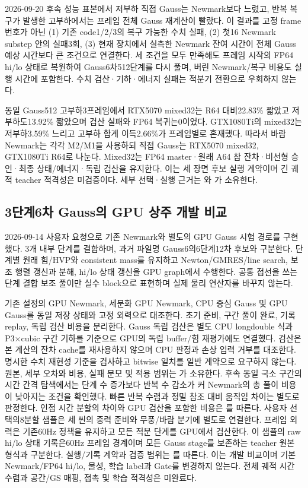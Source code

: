 \documentclass[10pt]{article}
\begin{document}
2026-09-20 후속 성능 표본에서 저부하 직접 Gauss는 Newmark보다 느렸고,
반복 복구가 발생한 고부하에서는 프레임 전체 Gauss 재계산이 빨랐다. 이 결과를
고정 frame 번호가 아닌 (1) 기존 code1/2/3의 복구 가능한 수치 실패, (2) 첫16 Newmark
substep 안의 실패3회, (3) 현재 장치에서 실측한 Newmark 잔여 시간이 전체 Gauss
예상 시간보다 큰 조건으로 연결한다. 세 조건을 모두 만족해도 프레임 시작의
FP64 hi/lo 상태로 복원하여 Gauss6차512단계를 다시 풀며, 버린 Newmark/복구 비용도
실행 시간에 포함한다. 수치 검산·기하·에너지 실패는 적분기 전환으로 우회하지 않는다.

동일 Gauss512 고부하3프레임에서 RTX5070 mixed32는 R64 대비22.83\% 짧았고
저부하도13.92\% 짧았으며 검산 실패와 FP64 복귀는0이었다. GTX1080Ti의 mixed32는
저부하3.59\% 느리고 고부하 합계 이득2.66\%가 프레임별로 혼재했다. 따라서 바람
Newmark는 각각 M2/M1을 사용하되 직접 Gauss는 RTX5070 mixed32, GTX1080Ti R64로 나눈다.
Mixed32는 FP64 master·원래 A64 참 잔차·비선형 승인·최종 상태/에너지·독립 검산을
유지한다. 이는 세 장면 후보 실행 계약이며 긴 궤적 teacher 적격성은 미검증이다.
세부 선택·실행 근거는
와
가 소유한다.

\subsection{3단계6차 Gauss의 GPU 상주 개발 비교}
2026-09-14 사용자 요청으로 기존 Newmark와 별도의 GPU Gauss 시험 경로를 구현했다.
3개 내부 단계를 결합하며, 과거 파일명 Gauss6의6단계12차 후보와 구분한다.
단계별 원래 힘/HVP와 consistent mass를 유지하고 Newton/GMRES/line search,
보조 행렬 갱신과 분해, hi/lo 상태 갱신을 GPU graph에서 수행한다.
공통 접선을 쓰는 단계 결합 보조 풀이만 실수 block으로 표현하며 실제 물리 연산자를 바꾸지 않는다.

기존 설정의 GPU Newmark, 세분화 GPU Newmark, CPU 중심 Gauss 및 GPU Gauss를
동일 저장 상태와 고정 외력으로 대조한다. 초기 준비, 구간 풀이 완료, 기록 replay,
독립 검산 비용을 분리한다. Gauss 독립 검산은 별도 CPU longdouble 식과
P3$\times$cubic 구간 기하를 기준으로 GPU의 독립 buffer/힘 재평가에도 연결했다.
검산은 본 계산의 잔차 cache를 재사용하지 않으며 CPU 판정과 손상 입력 거부를 대조한다.
명시한 수치 재현성 기준을 검사하고 bitwise 일치를 일반 계약으로 요구하지 않는다.
원본, 세부 오차와 비용, 실패 분모 및 적용 범위는
가 소유한다.
후속 동일 국소 구간의 시간 간격 탐색에서는 단계 수 증가보다 반복 수 감소가 커
Newmark의 총 풀이 비용이 낮아지는 조건을 확인했다. 빠른 반복 수렴과
정밀 참조 대비 움직임 차이는 별도로 판정한다. 인접 시간 분할의 차이와
GPU 검산을 포함한 비용은 를 따른다.
사용자 선택의8분할 샘플은 세 씬의 중력 준비와 무풍/바람 분기에 별도로 연결한다.
프레임 외력은 기존60Hz 정책을 유지하고 모든 적분 단계를 GPU에서 검산한다.
이 샘플의 raw hi/lo 상태 기록은60Hz 프레임 경계이며 모든 Gauss stage를 보존하는
teacher 원본 형식과 구분한다. 실행/기록 계약과 검증 범위는
를 따른다.
이는 개발 비교이며 기본 Newmark/FP64 hi/lo, 물성, 학습 label과 Gate를 변경하지 않는다.
전체 궤적 시간 수렴과 공간/GS 매핑, 접촉 및 학습 적격성은 미완료다.
\end{document}
